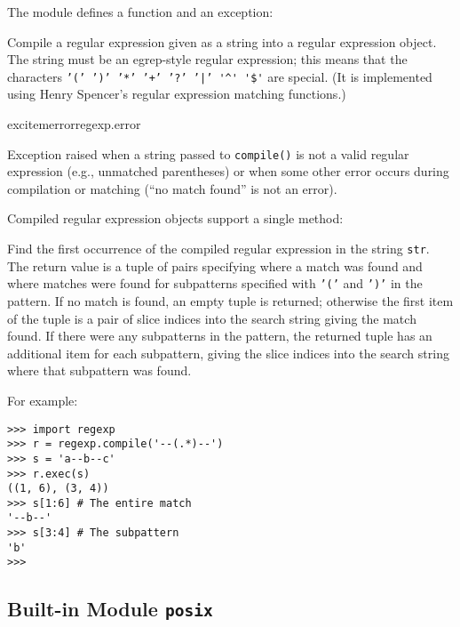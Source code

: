 The module defines a function and an exception:

\begin{description}


Compile a regular expression given as a string into a regular
expression object.
The string must be an egrep-style regular expression;
this means that the characters
{\tt '(' ')' '*' '+' '?'\ '|' }\verb='^' '$'=
are special.
(It is implemented using Henry Spencer's regular expression matching
functions.)

excitem{error}{regexp.error}

Exception raised when a string passed to {\tt compile()} is not a
valid regular expression (e.g., unmatched parentheses) or when some other
error occurs during compilation or matching
(``no match found'' is not an error).

\end{description}

Compiled regular expression objects support a single method:

\begin{description}


Find the first occurrence of the compiled regular expression in the
string {\tt str}.
The return value is a tuple of pairs specifying where a match was
found and where matches were found for subpatterns specified with
{\tt '('} and {\tt ')'} in the pattern.
If no match is found, an empty tuple is returned; otherwise the first
item of the tuple is a pair of slice indices into the search string
giving the match found.
If there were any subpatterns in the pattern, the returned tuple has an
additional item for each subpattern, giving the slice indices into the
search string where that subpattern was found.

\end{description}

For example:
\bcode\begin{verbatim}
>>> import regexp
>>> r = regexp.compile('--(.*)--')
>>> s = 'a--b--c'
>>> r.exec(s)
((1, 6), (3, 4))
>>> s[1:6] # The entire match
'--b--'
>>> s[3:4] # The subpattern
'b'
>>>
\end{verbatim}\ecode

\subsection{Built-in Module {\tt posix}}

